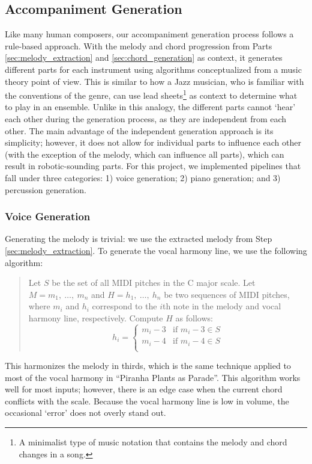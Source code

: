 \subsection{Accompaniment Generation}
\label{sec:accompaniment_generation}

Like many human composers, our accompaniment generation process follows a rule-based approach. With the melody and chord progression from Parts \ref{sec:melody_extraction} and \ref{sec:chord_generation} as context, it generates different parts for each instrument using algorithms conceptualized from a music theory point of view. This is similar to how a Jazz musician, who is familiar with the conventions of the genre, can use lead sheets\footnote{A minimalist type of music notation that contains the melody and chord changes in a song.} as context to determine what to play in an ensemble. Unlike in this analogy, the different parts cannot `hear' each other during the generation process, as they are independent from each other. The main advantage of the independent generation approach is its simplicity; however, it does not allow for individual parts to influence each other (with the exception of the melody, which can influence all parts), which can result in robotic-sounding parts. For this project, we implemented pipelines that fall under three categories: 1) voice generation; 2) piano generation; and 3) percussion generation.

\subsubsection{Voice Generation}

Generating the melody is trivial: we use the extracted melody from Step \ref{sec:melody_extraction}. To generate the vocal harmony line, we use the following algorithm:
\begin{quote}
    Let $S$ be the set of all MIDI pitches in the C major scale.
    Let $M = m_1, \ \ldots, \ m_n$ and $H = h_1, \ \ldots, \ h_n$ be two sequences of MIDI pitches, where $m_i$ and $h_i$ correspond to the $i$th note in the melody and vocal harmony line, respectively.
    Compute $H$ as follows:
    $$h_i = \begin{cases}
        m_i - 3 & \text{if }m_i - 3 \in S \\
        m_i - 4 & \text{if }m_i - 4 \in S \\
    \end{cases}$$
\end{quote}
This harmonizes the melody in thirds, which is the same technique applied to most of the vocal harmony in ``Piranha Plants as Parade''. This algorithm works well for most inputs; however, there is an edge case when the current chord conflicts with the scale. Because the vocal harmony line is low in volume, the occasional `error' does not overly stand out.

